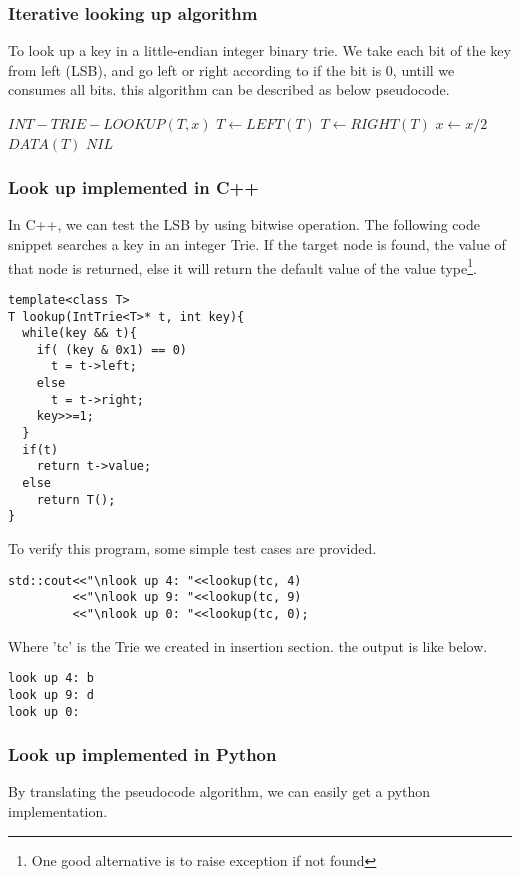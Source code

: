 \documentclass{article}
\begin{document}
\subsubsection{Iterative looking up algorithm}

To look up a key in a little-endian integer binary trie. We take each
bit of the key from left (LSB), and go left or right according to if
the bit is 0, untill we consumes all bits. this algorithm can be described
as below pseudocode.

\begin{algorithmic}
\STATE $INT-TRIE-LOOKUP(T, x)$
      \STATE $T \leftarrow LEFT(T)$
    \ELSE
      \STATE $T \leftarrow RIGHT(T)$
    \ENDIF
    \STATE $x \leftarrow x/2$
  \ENDWHILE
   \RETURN $DATA(T)$
  \ELSE \RETURN $NIL$ \ENDIF
\end{algorithmic}

\subsubsection*{Look up implemented in C++}
In C++, we can test the LSB by using bitwise operation. The following code
snippet searches a key in an integer Trie. If the target node is found, the
value of that node is returned, else it will return the default value of the
value type\footnote{One good alternative is to raise exception if not found}.
\lstset{language=C++}
\begin{lstlisting}
template<class T>
T lookup(IntTrie<T>* t, int key){
  while(key && t){
    if( (key & 0x1) == 0)
      t = t->left;
    else
      t = t->right;
    key>>=1;
  }
  if(t)
    return t->value;
  else
    return T();
}
\end{lstlisting}

To verify this program, some simple test cases are provided.

\begin{lstlisting}
std::cout<<"\nlook up 4: "<<lookup(tc, 4)
         <<"\nlook up 9: "<<lookup(tc, 9)
         <<"\nlook up 0: "<<lookup(tc, 0);
\end{lstlisting}

Where 'tc' is the Trie we created in insertion section. the output is like below.
\begin{verbatim}
look up 4: b
look up 9: d
look up 0: 
\end{verbatim}

\subsubsection*{Look up implemented in Python}
By translating the pseudocode algorithm, we can easily get a python 
implementation.
\end{document}

